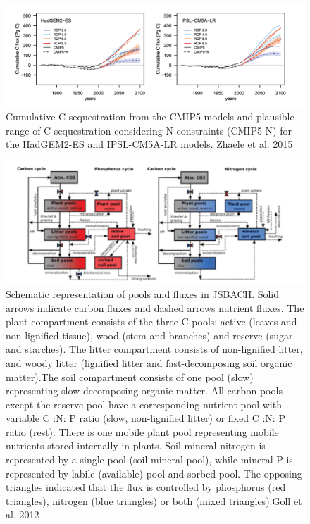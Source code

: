 \documentclass[12pt,oneside]{book}
\begin{document}
\begin{figure}

{\centering \includegraphics[width=0.8\linewidth]{figures/chap5/f520_zhaele} 

}

\caption{Cumulative C sequestration from the CMIP5 models and plausible range of C sequestration considering N constraints (CMIP5-N) for the HadGEM2-ES and IPSL-CM5A-LR models. Zhaele et al. 2015}\label{fig:f520}
\end{figure}

\begin{figure}

{\centering \includegraphics[width=0.8\linewidth]{figures/chap5/f521_goll_jsbach} 

}

\caption{Schematic representation of pools and fluxes in JSBACH. Solid arrows indicate carbon fluxes and dashed arrows nutrient fluxes. The plant compartment consists of the three C pools: active (leaves and non-lignified tissue), wood (stem and branches) and reserve (sugar and starches). The litter compartment consists of non-lignified litter, and woody litter (lignified litter and fast-decomposing soil organic matter).The soil compartment consists of one pool (slow) representing slow-decomposing organic matter. All carbon pools except the reserve pool have a corresponding nutrient pool with variable C :N: P ratio (slow, non-lignified litter) or fixed C :N: P ratio (rest). There is one mobile plant pool representing mobile nutrients stored internally in plants. Soil mineral nitrogen is represented by a single pool (soil mineral pool), while mineral P is represented by labile (available) pool and sorbed pool. The opposing triangles indicated that the flux is controlled by phosphorus (red triangles), nitrogen (blue triangles) or both (mixed triangles).Goll et al. 2012}\label{fig:f521}
\end{figure}
\end{document}
